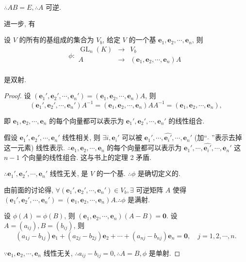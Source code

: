 \documentclass{ctexart}
\begin{document}
$\therefore AB=E,\therefore A$ 可逆.

进一步, 有
\begin{theorem}\label{t1.1}
    设 $V$ 的所有的基组成的集合为 $V_b$, 给定 $V$ 的一个基 $\boldsymbol{e}_1,\boldsymbol{e}_2,\cdots,\boldsymbol{e}_n$, 则
    \[\phi:\begin{array}{rcl}
        \operatorname{GL}_n(K) & \to & V_b \\
        A & \to & (\boldsymbol{e}_1,\boldsymbol{e}_2,\cdots,\boldsymbol{e}_n)A \\
    \end{array}\]

    是双射.
\end{theorem}
\begin{proof}
    设 $(\boldsymbol{e}_1',\boldsymbol{e}_2',\cdots,\boldsymbol{e}_n')=(\boldsymbol{e}_1,\boldsymbol{e}_2,\cdots,\boldsymbol{e}_n)A$, 则
    \[(\boldsymbol{e}_1',\boldsymbol{e}_2',\cdots,\boldsymbol{e}_n')A^{-1}=(\boldsymbol{e}_1,\boldsymbol{e}_2,\cdots,\boldsymbol{e}_n)AA^{-1}=(\boldsymbol{e}_1,\boldsymbol{e}_2,\cdots,\boldsymbol{e}_n),\]

    即 $\boldsymbol{e}_1,\boldsymbol{e}_2,\cdots,\boldsymbol{e}_n$ 的每个向量都可以表示为 $\boldsymbol{e}_1',\boldsymbol{e}_2',\cdots,\boldsymbol{e}_n'$ 的线性组合.

    假设 $\boldsymbol{e}_1',\boldsymbol{e}_2',\cdots,\boldsymbol{e}_n'$ 线性相关, 则 $\exists i,\boldsymbol{e}_i'$ 可以被 $\boldsymbol{e}_1',\cdots,\widehat{\boldsymbol{e}_i'},\cdots,\boldsymbol{e}_n'$ (加`` $\hat{}$ ''表示去掉这一元素) 线性表示. $\therefore\boldsymbol{e}_1,\boldsymbol{e}_2,\cdots,\boldsymbol{e}_n$ 的每个向量都可以表示为 $\boldsymbol{e}_1',\cdots,\widehat{\boldsymbol{e}_i'},\cdots,\boldsymbol{e}_n'$ 这 $n-1$ 个向量的线性组合. 这与书上的定理 2 矛盾.

    $\therefore\boldsymbol{e}_1',\boldsymbol{e}_2',\cdots,\boldsymbol{e}_n'$ 线性无关, 是 $V$ 的一个基. $\therefore\phi$ 是确切定义的.

    由前面的讨论得, $\forall(\boldsymbol{e}_1',\boldsymbol{e}_2',\cdots,\boldsymbol{e}_n')\in V_b,\exists$ 可逆矩阵 $A$ 使得 $(\boldsymbol{e}_1',\boldsymbol{e}_2',\cdots,\boldsymbol{e}_n')=(\boldsymbol{e}_1,\boldsymbol{e}_2,\cdots,\boldsymbol{e}_n)A.\therefore\phi$ 是满射.

    设 $\phi(A)=\phi(B)$, 则 $(\boldsymbol{e}_1,\boldsymbol{e}_2,\cdots,\boldsymbol{e}_n)(A-B)=\boldsymbol{0}$. 设 $A=(a_{ij}),B=(b_{ij})$, 则
    \[(a_{1j}-b_{1j})\boldsymbol{e}_1+(a_{2j}-b_{2j})\boldsymbol{e}_2+\cdots+(a_{nj}-b_{nj})\boldsymbol{e}_n=\boldsymbol{0},\quad j=1,2,\cdots,n.\]

    $\because\boldsymbol{e}_1,\boldsymbol{e}_2,\cdots,\boldsymbol{e}_n$ 线性无关, $\therefore a_{ij}-b_{ij}=0,\therefore A=B,\phi$ 是单射.
\end{proof}
\end{document}
